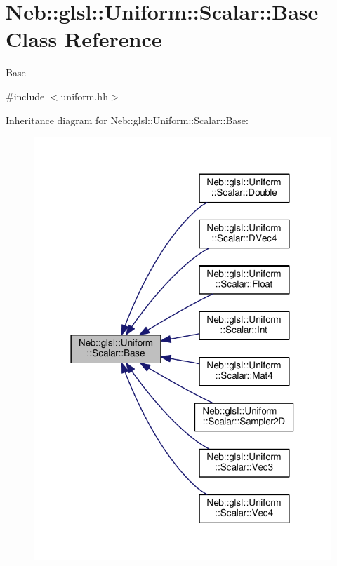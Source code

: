 \hypertarget{classNeb_1_1glsl_1_1Uniform_1_1Scalar_1_1Base}{\section{Neb\-:\-:glsl\-:\-:Uniform\-:\-:Scalar\-:\-:Base Class Reference}
\label{classNeb_1_1glsl_1_1Uniform_1_1Scalar_1_1Base}
}


Base  




{\ttfamily \#include $<$uniform.\-hh$>$}



Inheritance diagram for Neb\-:\-:glsl\-:\-:Uniform\-:\-:Scalar\-:\-:Base\-:
\nopagebreak
\begin{figure}[H]
\begin{center}
\leavevmode
\includegraphics[width=318pt]{classNeb_1_1glsl_1_1Uniform_1_1Scalar_1_1Base__inherit__graph}
\end{center}
\end{figure}
